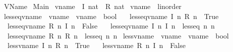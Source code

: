 %
\begin{isabellebody}%
%
%
\isadelimtheory
%
\endisadelimtheory
%
\isatagtheory
{}\isamarkupfalse%
\ VName\isanewline
{}\ Main\isanewline
{}%
\endisatagtheory
{\isafoldtheory}%
%
\isadelimtheory
\isanewline
%
\endisadelimtheory
{}\isamarkupfalse%
\ vname\ {\isacharequal}\ I\ nat\ {\isacharbar}\ R\ nat\isanewline
\isanewline
{}\isamarkupfalse%
\ vname\ {\isacharcolon}{\isacharcolon}\ linorder\ \isanewline
{}\isamarkupfalse%
\ less{\isacharunderscore}eq{\isacharunderscore}vname\ {\isacharcolon}{\isacharcolon}\ {\isachardoublequoteopen}vname\ {\isasymRightarrow}\ vname\ {\isasymRightarrow}\ bool{\isachardoublequoteclose}\ \isanewline
\ \ {\isachardoublequoteopen}less{\isacharunderscore}eq{\isacharunderscore}vname\ {\isacharparenleft}I\ n{}{\isacharparenright}\ {\isacharparenleft}R\ n{}{\isacharparenright}\ {\isacharequal}\ True{\isachardoublequoteclose}\ {\isacharbar}\isanewline
\ \ {\isachardoublequoteopen}less{\isacharunderscore}eq{\isacharunderscore}vname\ {\isacharparenleft}R\ n{}{\isacharparenright}\ {\isacharparenleft}I\ n{}{\isacharparenright}\ {\isacharequal}\ False{\isachardoublequoteclose}\ {\isacharbar}\isanewline
\ \ {\isachardoublequoteopen}less{\isacharunderscore}eq{\isacharunderscore}vname\ {\isacharparenleft}I\ n{}{\isacharparenright}\ {\isacharparenleft}I\ n{}{\isacharparenright}\ {\isacharequal}\ less{\isacharunderscore}eq\ n{}\ n{}{\isachardoublequoteclose}\ {\isacharbar}\isanewline
\ \ {\isachardoublequoteopen}less{\isacharunderscore}eq{\isacharunderscore}vname\ {\isacharparenleft}R\ n{}{\isacharparenright}\ {\isacharparenleft}R\ n{}{\isacharparenright}\ {\isacharequal}\ less{\isacharunderscore}eq\ n{}\ n{}{\isachardoublequoteclose}\isanewline
\isanewline
{}\isamarkupfalse%
\ less{\isacharunderscore}vname\ {\isacharcolon}{\isacharcolon}\ {\isachardoublequoteopen}vname\ {\isasymRightarrow}\ vname\ {\isasymRightarrow}\ bool{\isachardoublequoteclose}\ \isanewline
\ \ {\isachardoublequoteopen}less{\isacharunderscore}vname\ {\isacharparenleft}I\ n{}{\isacharparenright}\ {\isacharparenleft}R\ n{}{\isacharparenright}\ {\isacharequal}\ True{\isachardoublequoteclose}\ {\isacharbar}\isanewline
\ \ {\isachardoublequoteopen}less{\isacharunderscore}vname\ {\isacharparenleft}R\ n{}{\isacharparenright}\ {\isacharparenleft}I\ n{}{\isacharparenright}\ {\isacharequal}\ False{\isachardoublequoteclose}\ {\isacharbar}\isanewline

\end{isabellebody}
